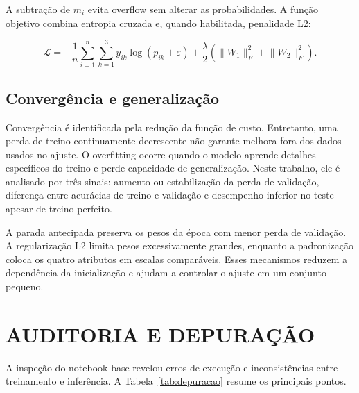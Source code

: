 \documentclass[12pt,a4paper,oneside,openany,chapter=TITLE,section=TITLE,subsection=TITLE,brazil]{abntex2}
\begin{document}
A subtração de $m_i$ evita overflow sem alterar as probabilidades. A função objetivo combina entropia cruzada e, quando habilitada, penalidade L2:

\begin{equation}
  \mathcal{L} = -\frac{1}{n}\sum_{i=1}^{n}\sum_{k=1}^{3} y_{ik}\log(p_{ik}+\varepsilon)
  + \frac{\lambda}{2}\left(\lVert W_1\rVert_F^2 + \lVert W_2\rVert_F^2\right).
\end{equation}

\section{Convergência e generalização}

Convergência é identificada pela redução da função de custo. Entretanto, uma perda de treino continuamente decrescente não garante melhora fora dos dados usados no ajuste. O overfitting ocorre quando o modelo aprende detalhes específicos do treino e perde capacidade de generalização. Neste trabalho, ele é analisado por três sinais: aumento ou estabilização da perda de validação, diferença entre acurácias de treino e validação e desempenho inferior no teste apesar de treino perfeito.

A parada antecipada preserva os pesos da época com menor perda de validação. A regularização L2 limita pesos excessivamente grandes, enquanto a padronização coloca os quatro atributos em escalas comparáveis. Esses mecanismos reduzem a dependência da inicialização e ajudam a controlar o ajuste em um conjunto pequeno.

\chapter{AUDITORIA E DEPURAÇÃO}

A inspeção do notebook-base revelou erros de execução e inconsistências entre treinamento e inferência. A Tabela~\ref{tab:depuracao} resume os principais pontos.
\end{document}
